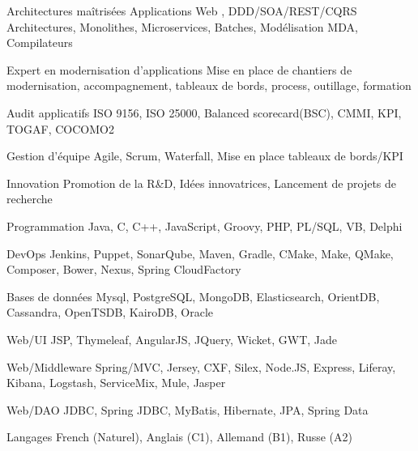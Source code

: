 

\begin{cvskills}

  \cvskill
  {Architectures maîtrisées} %
  {Applications Web , DDD/SOA/REST/CQRS Architectures, Monolithes, Microservices, Batches, Modélisation MDA, Compilateurs} %


  \cvskill
  {Expert en modernisation d'applications} %
  {Mise en place de chantiers de modernisation, accompagnement, tableaux de bords, process, outillage, formation} %


  \cvskill
  {Audit applicatifs} %
  {ISO 9156, ISO 25000, Balanced scorecard(BSC), CMMI, KPI, TOGAF, COCOMO2} %

  \cvskill
  {Gestion d'équipe} %
  {Agile, Scrum, Waterfall, Mise en place tableaux de bords/KPI} %

  \cvskill
  {Innovation} %
  {Promotion de la R\&D, Idées innovatrices, Lancement de projets de recherche} %

  \cvskill
  {Programmation} %
  {Java, C, C++, JavaScript, Groovy, PHP, PL/SQL, VB, Delphi} %
  
  \cvskill
  {DevOps} %
  {Jenkins, Puppet, SonarQube, Maven, Gradle, CMake, Make, QMake, Composer, Bower, Nexus, Spring CloudFactory} %
  
  \cvskill
  {Bases de données} %
  {Mysql, PostgreSQL, MongoDB, Elasticsearch, OrientDB, Cassandra, OpenTSDB, KairoDB, Oracle} %
  
  \cvskill
  {Web/UI} %
  {JSP, Thymeleaf, AngularJS, JQuery, Wicket, GWT, Jade} %
  
  \cvskill
  {Web/Middleware} %
  {Spring/MVC, Jersey, CXF, Silex, Node.JS, Express, Liferay, Kibana, Logstash, ServiceMix, Mule, Jasper} %
  
  
  \cvskill
  {Web/DAO} %
  {JDBC, Spring JDBC, MyBatis, Hibernate, JPA, Spring Data} %
  

  \cvskill
    {Langages} %
    {French (Naturel), Anglais (C1), Allemand (B1), Russe (A2)} %

\end{cvskills}
